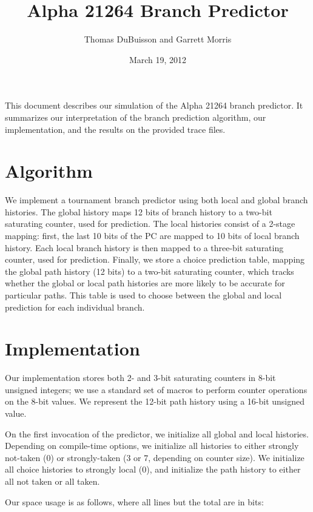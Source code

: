 \documentclass[11pt]{article}
\title{Alpha 21264 Branch Predictor}
\author{Thomas DuBuisson and Garrett Morris}
\date{March 19, 2012}
\begin{document}
\maketitle

This document describes our simulation of the Alpha 21264 branch predictor.  It summarizes our
interpretation of the branch prediction algorithm, our implementation, and the results on the
provided trace files.

\section{Algorithm}

We implement a tournament branch predictor using both local and global branch histories.  The global
history maps 12 bits of branch history to a two-bit saturating counter, used for prediction.  The
local histories consist of a 2-stage mapping: first, the last 10 bits of the PC are mapped to 10
bits of local branch history.  Each local branch history is then mapped to a three-bit saturating
counter, used for prediction.  Finally, we store a choice prediction table, mapping the global path
history (12 bits) to a two-bit saturating counter, which tracks whether the global or local path
histories are more likely to be accurate for particular paths.  This table is used to choose between
the global and local prediction for each individual branch.

\section{Implementation}

Our implementation stores both 2- and 3-bit saturating counters in 8-bit unsigned integers; we use a
standard set of macros to perform counter operations on the 8-bit values.  We represent the 12-bit
path history using a 16-bit unsigned value.

On the first invocation of the predictor, we initialize all global and local histories.  Depending
on compile-time options, we initialize all histories to either strongly not-taken (0) or
strongly-taken (3 or 7, depending on counter size).  We initialize all choice histories to strongly
local (0), and initialize the path history to either all not taken or all taken.

Our space usage is as follows, where all lines but the total are in bits:
\end{document}
